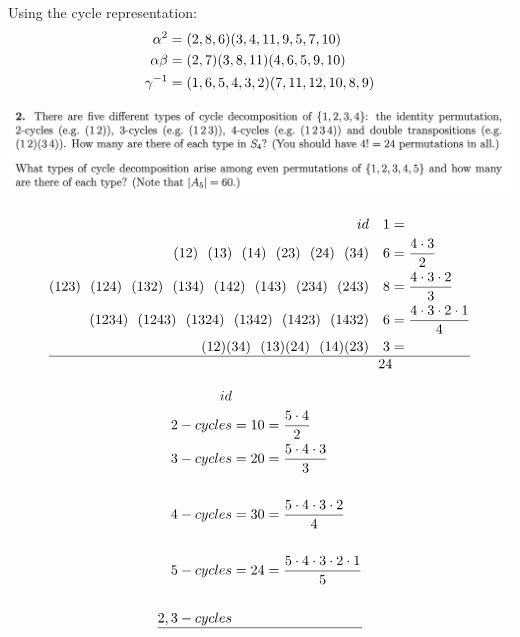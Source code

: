 \documentclass[12pt]{article}
\begin{document}
Using the cycle representation:
\begin{align*}
  \alpha^2    &= (2,8,6)(3,4,11,9,5,7,10)\\
  \alpha\beta &= (2,7)(3,8,11)(4,6,5,9,10)\\
  \gamma^{-1}   &= (1,6,5,4,3,2)(7,11,12,10,8,9)\\
\end{align*}

\newpage
\begin{mdframed}
\includegraphics[width=400pt]{img/oxford-prelims-M1-groups-2-2.png}
\end{mdframed}
\begin{align*}
  id                                                                   & ~~~ 1 = \\
  (12) ~~ (13) ~~ (14) ~~ (23) ~~ (24) ~~ (34)                         & ~~~ 6 = \frac{4 \cdot 3}{2}\\
  (123) ~~ (124) ~~ (132) ~~ (134) ~~ (142) ~~ (143) ~~ (234) ~~ (243) & ~~~ 8 = \frac{4 \cdot 3 \cdot 2}{3}\\
  (1234) ~~ (1243) ~~ (1324) ~~ (1342) ~~ (1423) ~~ (1432)             & ~~~ 6 = \frac{4 \cdot 3 \cdot 2 \cdot 1}{4}\\
  (12)(34) ~~ (13)(24) ~~ (14)(23)                                     & ~~~ 3 = \\
  \hline
                                                                       & ~~ 24
\end{align*}

\begin{align*}
  id & ~~~\\
  2-cycles &= 10 = \frac{5 \cdot 4}{2}\\
  3-cycles &= 20 = \frac{5 \cdot 4 \cdot 3}{3}\\\\
  4-cycles &= 30 = \frac{5 \cdot 4 \cdot 3 \cdot 2}{4}\\\\
  5-cycles &= 24 = \frac{5 \cdot 4 \cdot 3 \cdot 2 \cdot 1}{5}\\\\
  2,3-cycles\\
  \hline
\end{align*}
\end{document}

